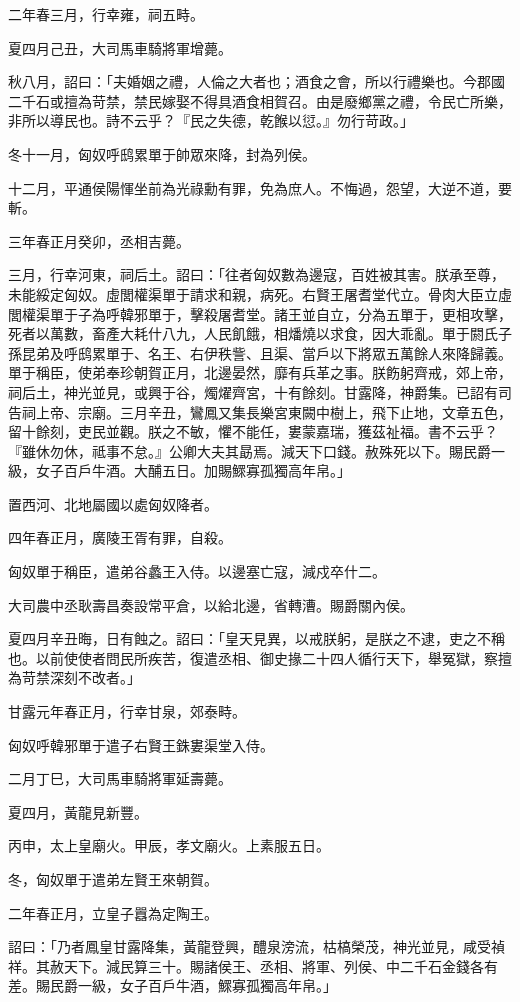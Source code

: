 \begin{pinyinscope}
二年春三月，行幸雍，祠五畤。

夏四月己丑，大司馬車騎將軍增薨。

秋八月，詔曰：「夫婚姻之禮，人倫之大者也；酒食之會，所以行禮樂也。今郡國二千石或擅為苛禁，禁民嫁娶不得具酒食相賀召。由是廢鄉黨之禮，令民亡所樂，非所以導民也。詩不云乎？『民之失德，乾餱以愆。』勿行苛政。」

冬十一月，匈奴呼鸱累單于帥眾來降，封為列侯。

十二月，平通侯陽惲坐前為光祿勳有罪，免為庶人。不悔過，怨望，大逆不道，要斬。

三年春正月癸卯，丞相吉薨。

三月，行幸河東，祠后土。詔曰：「往者匈奴數為邊寇，百姓被其害。朕承至尊，未能綏定匈奴。虛閭權渠單于請求和親，病死。右賢王屠耆堂代立。骨肉大臣立虛閭權渠單于子為呼韓邪單于，擊殺屠耆堂。諸王並自立，分為五單于，更相攻擊，死者以萬數，畜產大耗什八九，人民飢餓，相燔燒以求食，因大乖亂。單于閼氏子孫昆弟及呼鸱累單于、名王、右伊秩訾、且渠、當戶以下將眾五萬餘人來降歸義。單于稱臣，使弟奉珍朝賀正月，北邊晏然，靡有兵革之事。朕飭躬齊戒，郊上帝，祠后土，神光並見，或興于谷，燭燿齊宮，十有餘刻。甘露降，神爵集。已詔有司告祠上帝、宗廟。三月辛丑，鸞鳳又集長樂宮東闕中樹上，飛下止地，文章五色，留十餘刻，吏民並觀。朕之不敏，懼不能任，婁蒙嘉瑞，獲茲祉福。書不云乎？『雖休勿休，祗事不怠。』公卿大夫其勗焉。減天下口錢。赦殊死以下。賜民爵一級，女子百戶牛酒。大酺五日。加賜鰥寡孤獨高年帛。」

置西河、北地屬國以處匈奴降者。

四年春正月，廣陵王胥有罪，自殺。

匈奴單于稱臣，遣弟谷蠡王入侍。以邊塞亡寇，減戍卒什二。

大司農中丞耿壽昌奏設常平倉，以給北邊，省轉漕。賜爵關內侯。

夏四月辛丑晦，日有蝕之。詔曰：「皇天見異，以戒朕躬，是朕之不逮，吏之不稱也。以前使使者問民所疾苦，復遣丞相、御史掾二十四人循行天下，舉冤獄，察擅為苛禁深刻不改者。」

甘露元年春正月，行幸甘泉，郊泰畤。

匈奴呼韓邪單于遣子右賢王銖婁渠堂入侍。

二月丁巳，大司馬車騎將軍延壽薨。

夏四月，黃龍見新豐。

丙申，太上皇廟火。甲辰，孝文廟火。上素服五日。

冬，匈奴單于遣弟左賢王來朝賀。

二年春正月，立皇子囂為定陶王。

詔曰：「乃者鳳皇甘露降集，黃龍登興，醴泉滂流，枯槁榮茂，神光並見，咸受禎祥。其赦天下。減民算三十。賜諸侯王、丞相、將軍、列侯、中二千石金錢各有差。賜民爵一級，女子百戶牛酒，鰥寡孤獨高年帛。」


\end{pinyinscope}
